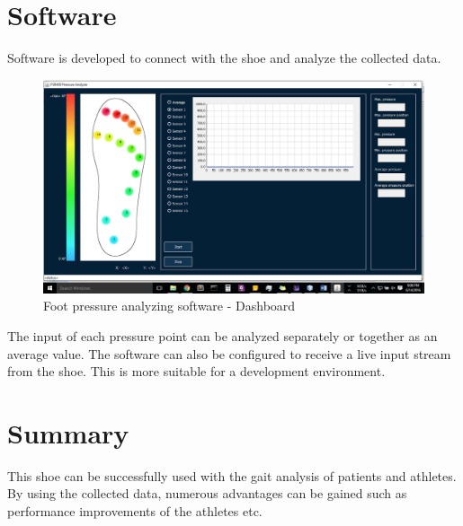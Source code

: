 \documentclass[a4paper]{report}
\begin{document}
	\newpage
	
	\section{Software}
	Software is developed to connect with the shoe and analyze the collected data.
	
	\begin{figure}[H]
		\includegraphics[width = \linewidth]{dashboard}
		\caption{Foot pressure analyzing software - Dashboard}
		\label{fig:dashboard}
	\end{figure}
	
	The input of each pressure point can be analyzed separately or together as an average value. The software can also be configured to receive a live input stream from the shoe. This is more suitable for a development environment.
	
	\newpage
	
	\section{Summary}
	This shoe can be successfully used with the gait analysis of patients and athletes.  By using the collected data, numerous advantages can be gained such as performance improvements of the athletes etc.
	
\end{document}

